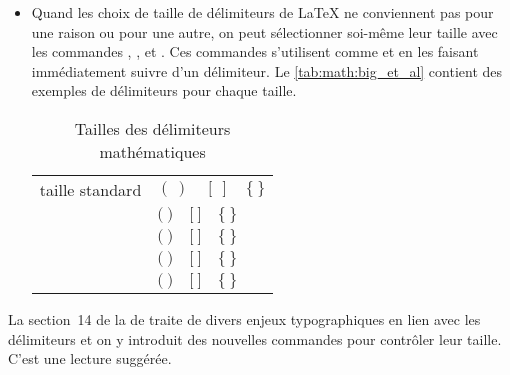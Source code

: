 \begin{itemize}
\begin{demo}
\begin{texample}
\begin{align*}
          + \frac{e}{f} - g
          \right)
      \end{align*}
    \end{texample}
  \end{demo}
%
\item Quand les choix de taille de délimiteurs de {\LaTeX} ne
  conviennent pas pour une raison ou pour une autre, on peut
  sélectionner soi-même leur taille avec les commandes %
  \cmd{\big}, %
  \cmd{\Big}, %
  \cmd{\bigg} et %
  \cmd{\Bigg}. %
  Ces commandes s'utilisent comme \cmdprint{\left} et
    \cmdprint{\right} en les faisant immédiatement suivre d'un
  délimiteur. Le \autoref{tab:math:big_et_al} contient des exemples de
  délimiteurs pour chaque taille.

  \begin{table}
    \centering
    \caption{Tailles des délimiteurs mathématiques}
    \label{tab:math:big_et_al}
    \begin{tabular}{ll}
      taille standard & $(~) \quad [~] \quad \{~\}$ \\
      \addlinespace[6pt]
      \cmd{\big} & $\big(~\big) \quad \big[~\big] \quad \big\{~\big\}$ \\
      \addlinespace[6pt]
      \cmd{\Big} & $\Big(~\Big) \quad \Big[~\Big] \quad \Big\{~\Big\}$ \\
      \addlinespace[6pt]
      \cmd{\bigg} & $\bigg(~\bigg) \quad \bigg[~\bigg] \quad \bigg\{~\bigg\}$ \\
      \addlinespace[6pt]
      \cmd{\Bigg} & $\Bigg(~\Bigg) \quad \Bigg[~\Bigg] \quad \Bigg\{~\Bigg\}$ \\
    \end{tabular}
  \end{table}
\end{itemize}

La section~14 de la %
de  traite de divers enjeux typographiques en lien
avec les délimiteurs et on y introduit des nouvelles commandes pour
contrôler leur taille. C'est une lecture suggérée.

